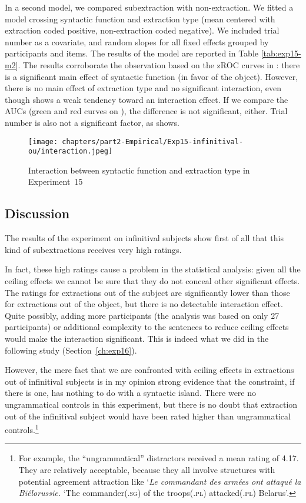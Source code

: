 In a second model, we compared subextraction with non-extraction. We fitted a model crossing syntactic function and extraction type (mean centered with extraction coded positive, non-extraction coded negative). We included trial number as a covariate, and random slopes for all fixed effects grouped by participants and items. The results of the model are reported in Table \ref{tab:exp15-m2}. 
The results corroborate the observation based on the zROC curves in : there is a significant main effect of syntactic function (in favor of the object). 
However, there is no main effect of extraction type and no significant interaction, even though  shows a weak tendency toward an interaction effect. If we compare the AUCs (green and red curves on ), the difference is not significant, either. Trial number is also not a significant factor, as  shows. 



\begin{figure}
    \centering
    \texttt{[image: chapters/part2-Empirical/Exp15-infinitival-ou/interaction.jpeg]}
    \caption{Interaction between syntactic function and extraction type in Experiment~15}
    \label{fig:exp15-interaction}
\end{figure}

\subsection{Discussion}

The results of the experiment on infinitival subjects show first of all that this kind of subextractions receives very high ratings. 

In fact, these high ratings cause a problem in the statistical analysis: given all the ceiling effects we cannot be sure that they do not conceal other significant effects. The ratings for extractions out of the subject are significantly lower than those for extractions out of the object, but there is no detectable interaction effect. Quite possibly, adding more participants (the analysis was based on only 27 participants) or additional complexity to the sentences to reduce ceiling effects would make the interaction significant. This is indeed what we did in the following study (Section~\ref{ch:exp16}).

However, the mere fact that we are confronted with ceiling effects in extractions out of infinitival subjects is in my opinion strong evidence that the constraint, if there is one, has nothing to do with a syntactic island. There were no ungrammatical controls in this experiment, but there is no doubt that extraction out of the infinitival subject would have been rated higher than ungrammatical controls.\footnote{For example, the ``ungrammatical'' distractors received a mean rating of 4.17. They are relatively acceptable, because they all involve structures with potential agreement attraction like `\emph{Le commandant des armées ont attaqué la Biélorussie.} `The commander(.\textsc{sg}) of the troops(.\textsc{pl}) attacked(.\textsc{pl}) Belarus'.}


